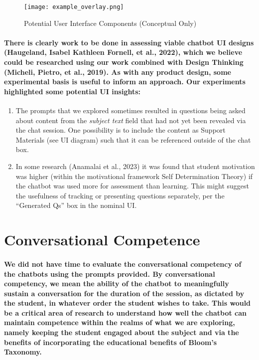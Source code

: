 \documentclass{article}
\begin{document}
\begin{figure}
    \centering
    \texttt{[image: example\_overlay.png]}
    \caption{Potential User Interface Components (Conceptual Only)}
    \label{fig:Example_Overlay}
\end{figure}

\paragraph{There is clearly work to be done in assessing viable chatbot UI designs (Haugeland, Isabel Kathleen Fornell, et al., 2022), which we believe could be researched using our work combined with Design Thinking (Micheli, Pietro, et al., 2019). As with any product design, some experimental basis is useful to inform an approach. Our experiments highlighted some potential UI insights:}

\begin{enumerate}
    \item The prompts that we explored sometimes resulted in questions being asked about content from the \textit{subject text} field that had not yet been revealed via the chat session. One possibility is to include the content as Support Materials (see UI diagram) such that it can be referenced outside of the chat box.\newline
    \item  In some research (Anamalai et al., 2023)  it was found that student motivation was higher (within the motivational framework Self Determination Theory) if the chatbot was used more for assessment than learning. This might suggest the usefulness of tracking or presenting questions separately, per the “Generated Qs'' box in the nominal UI.

\end{enumerate}

\section*{Conversational Competence}

\paragraph{We did not have time to evaluate the conversational competency of the chatbots using the prompts provided. By conversational competency, we mean the ability of the chatbot to meaningfully sustain a conversation for the duration of the session, as dictated by the student, in whatever order the student wishes to take. This would be a critical area of research to understand how well the chatbot can maintain competence within the realms of what we are exploring, namely keeping the student engaged about the subject and via the benefits of incorporating the educational benefits of Bloom’s Taxonomy.}
\end{document}
